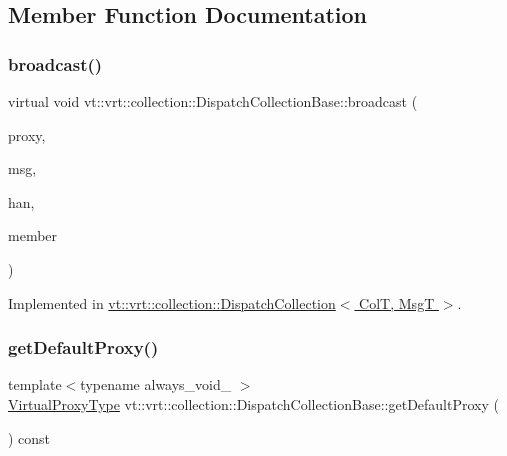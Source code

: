 \subsection{Member Function Documentation}
\mbox{\label{structvt_1_1vrt_1_1collection_1_1_dispatch_collection_base_aa2f5d59eefb10ba8c7ba2432efff9ad3}} 
\subsubsection{\texorpdfstring{broadcast()}{broadcast()}}
{\footnotesize\ttfamily virtual void vt\+::vrt\+::collection\+::\+Dispatch\+Collection\+Base\+::broadcast (\begin{DoxyParamCaption}\item[{\hyperlink{namespacevt_a1b417dd5d684f045bb58a0ede70045ac}{Virtual\+Proxy\+Type}}]{proxy,  }\item[{void $\ast$}]{msg,  }\item[{\hyperlink{namespacevt_af64846b57dfcaf104da3ef6967917573}{Handler\+Type}}]{han,  }\item[{bool}]{member }\end{DoxyParamCaption})\hspace{0.3cm}{\ttfamily [pure virtual]}}



Implemented in \hyperlink{structvt_1_1vrt_1_1collection_1_1_dispatch_collection_aac39e73dc1609a4c865b3e69c55355ec}{vt\+::vrt\+::collection\+::\+Dispatch\+Collection$<$ Col\+T, Msg\+T $>$}.

\mbox{\label{structvt_1_1vrt_1_1collection_1_1_dispatch_collection_base_a7ff0d68977083eb225da837b6a8cef7d}} 
\subsubsection{\texorpdfstring{get\+Default\+Proxy()}{getDefaultProxy()}}
{\footnotesize\ttfamily template$<$typename always\+\_\+void\+\_\+ $>$ \\
\hyperlink{namespacevt_a1b417dd5d684f045bb58a0ede70045ac}{Virtual\+Proxy\+Type} vt\+::vrt\+::collection\+::\+Dispatch\+Collection\+Base\+::get\+Default\+Proxy (\begin{DoxyParamCaption}{ }\end{DoxyParamCaption}) const}

